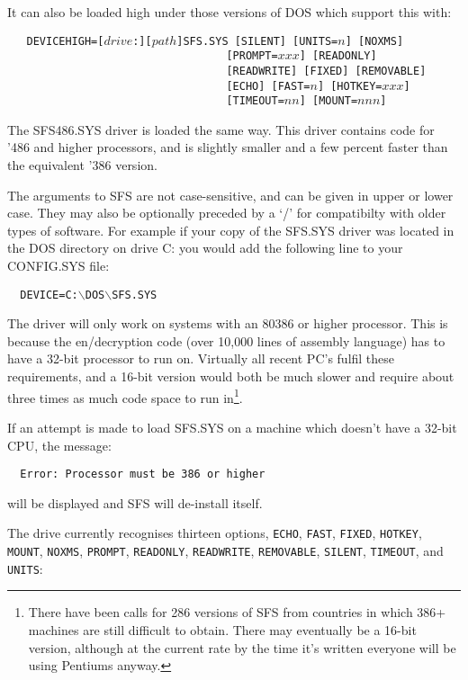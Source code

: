 It can also be loaded high under those versions of DOS which support this with:

{\tt
\verb|  |DEVICEHIGH=[$drive$:][$path$]SFS.SYS [SILENT] [UNITS=$n$] [NOXMS]\\
\verb|                                  |[PROMPT=$xxx$] [READONLY]\\
\verb|                                  |[READWRITE] [FIXED] [REMOVABLE]\\
\verb|                                  |[ECHO] [FAST=$n$] [HOTKEY=$xxx$]\\
\verb|                                  |[TIMEOUT=$nn$] [MOUNT=$nnn$]}

The SFS486.SYS driver is loaded the same way.  This driver contains code for
'486 and higher processors, and is slightly smaller and a few percent faster
than the equivalent '386 version.

The arguments to SFS are not case-sensitive, and can be given in upper or lower
case.  They may also be optionally preceded by a `/' for compatibilty with
older types of software.  For example if your copy of the SFS.SYS driver was 
located in the DOS directory on drive C: you would add the following line to 
your CONFIG.SYS file:

{\tt \verb|  |DEVICE=C:$\backslash$DOS$\backslash$SFS.SYS}

The driver will only work on systems with an 80386 or higher processor.  This
is because the en/decryption code (over 10,000 lines of assembly language) has
to have a 32-bit processor to run on.  Virtually all recent PC's fulfil these
requirements, and a 16-bit version would both be much slower and require about
three times as much code space to run in\footnote{
              There have been calls for 286 versions of SFS from countries in
              which 386+ machines are still difficult to obtain.  There may
              eventually be a 16-bit version, although at the current rate by
              the time it's written everyone will be using Pentiums anyway.
}.

If an attempt is made to load SFS.SYS on a machine which doesn't have a 32-bit
CPU, the message:

{\tt \verb|  |Error: Processor must be 386 or higher}

will be displayed and SFS will de-install itself.

The drive currently recognises thirteen options, {\tt ECHO}, {\tt FAST}, {\tt FIXED}, {\tt HOTKEY},
{\tt MOUNT}, {\tt NOXMS}, {\tt PROMPT}, {\tt READONLY}, {\tt READWRITE}, {\tt REMOVABLE}, {\tt SILENT}, {\tt TIMEOUT}, and 
{\tt UNITS}:

